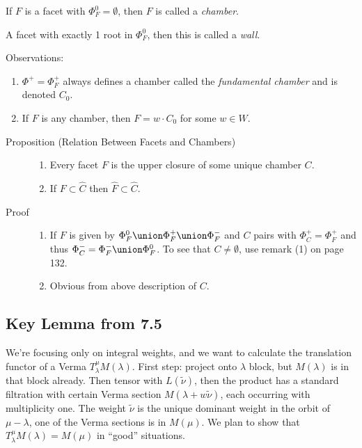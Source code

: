 \begin{description}
\tightlist
\item[Definition (Chambers)]
If \(F\) is a facet with \(\Phi_F^0=\emptyset\), then \(F\) is called a
\emph{chamber}.
\end{description}

A facet with exactly 1 root in \(\Phi_F^0\), then this is called a
\emph{wall}.

Observations:

\begin{enumerate}
\def\labelenumi{\arabic{enumi}.}
\tightlist
\item
  \(\Phi^+ = \Phi_F^+\) always defines a chamber called the
  \emph{fundamental chamber} and is denoted \(C_0\).
\item
  If \(F\) is any chamber, then \(F = w\cdot C_0\) for some \(w\in W\).
\end{enumerate}

\begin{description}
\item[Proposition (Relation Between Facets and Chambers)]
\hfill

\begin{enumerate}
\def\labelenumi{\alph{enumi}.}
\tightlist
\item
  Every facet \(F\) is the upper closure of some unique chamber \(C\).
\item
  If \(F \subset \hat C\) then \(\hat F \subset \hat C\).
\end{enumerate}
\item[Proof]
\hfill

\begin{enumerate}
\def\labelenumi{\alph{enumi}.}
\tightlist
\item
  If \(F\) is given by \(\Phi_F^0 \union \Phi_F^+ \union \Phi_F^-\) and
  \(C\) pairs with \(\Phi_C^+ = \Phi_F^+\) and thus
  \(\Phi_C^- = \Phi_F^- \union \Phi_F^0\). To see that
  \(C\neq \emptyset\), use remark (1) on page 132.
\item
  Obvious from above description of \(C\).
\end{enumerate}
\end{description}

\hypertarget{key-lemma-from-7.5}{%
\subsection{Key Lemma from 7.5}\label{key-lemma-from-7.5}}

We're focusing only on integral weights, and we want to calculate the
translation functor of a Verma \(T_\lambda^\mu M(\lambda)\). First step:
project onto \(\lambda\) block, but \(M(\lambda)\) is in that block
already. Then tensor with \(L(\tilde \nu)\), then the product has a
standard filtration with certain Verma section
\(M(\lambda + w\tilde \nu)\), each occurring with multiplicity one. The
weight \(\tilde \nu\) is the unique dominant weight in the orbit of
\(\mu - \lambda\), one of the Verma sections is in \(M(\mu)\). We plan
to show that \(T_\lambda^\mu M(\lambda) = M(\mu)\) in ``good''
situations.

